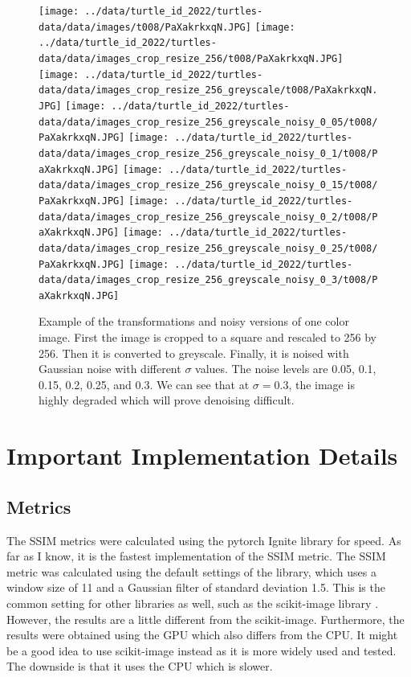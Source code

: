 \documentclass[12pt]{article}
\begin{document}
\begin{figure}
    \centering
    \texttt{[image: ../data/turtle\_id\_2022/turtles-data/data/images/t008/PaXakrkxqN.JPG]}
    \texttt{[image: ../data/turtle\_id\_2022/turtles-data/data/images\_crop\_resize\_256/t008/PaXakrkxqN.JPG]}
    \texttt{[image: ../data/turtle\_id\_2022/turtles-data/data/images\_crop\_resize\_256\_greyscale/t008/PaXakrkxqN.JPG]}
    \texttt{[image: ../data/turtle\_id\_2022/turtles-data/data/images\_crop\_resize\_256\_greyscale\_noisy\_0\_05/t008/PaXakrkxqN.JPG]}
    \texttt{[image: ../data/turtle\_id\_2022/turtles-data/data/images\_crop\_resize\_256\_greyscale\_noisy\_0\_1/t008/PaXakrkxqN.JPG]}
    \texttt{[image: ../data/turtle\_id\_2022/turtles-data/data/images\_crop\_resize\_256\_greyscale\_noisy\_0\_15/t008/PaXakrkxqN.JPG]}
    \texttt{[image: ../data/turtle\_id\_2022/turtles-data/data/images\_crop\_resize\_256\_greyscale\_noisy\_0\_2/t008/PaXakrkxqN.JPG]}
    \texttt{[image: ../data/turtle\_id\_2022/turtles-data/data/images\_crop\_resize\_256\_greyscale\_noisy\_0\_25/t008/PaXakrkxqN.JPG]}
    \texttt{[image: ../data/turtle\_id\_2022/turtles-data/data/images\_crop\_resize\_256\_greyscale\_noisy\_0\_3/t008/PaXakrkxqN.JPG]}
    \caption{Example of the transformations and noisy versions of one color image.
    First the image is cropped to a square and rescaled to 256 by 256.
    Then it is converted to greyscale.
    Finally, it is noised with Gaussian noise with different $\sigma$ values.
    The noise levels are 0.05, 0.1, 0.15, 0.2, 0.25, and 0.3.
    We can see that at $\sigma = 0.3$, the image is highly degraded which will prove denoising difficult.
    }
    \label{fig:example_turtle_images}

\end{figure}



\section{Important Implementation Details}

\subsection{Metrics}

The SSIM metrics were calculated using the pytorch Ignite library \cite{pytorch-ignite} for speed.
As far as I know, it is the fastest implementation of the SSIM metric.
The SSIM metric was calculated using the default settings of the library, which uses a window size of 11 and a Gaussian filter of standard deviation 1.5.
This is the common setting for other libraries as well, such as the scikit-image library \cite{scikit-image}.
However, the results are a little different from the scikit-image.
Furthermore, the results were obtained using the GPU which also differs from the CPU.
It might be a good idea to use scikit-image instead as it is more widely used and tested.
The downside is that it uses the CPU which is slower.
\end{document}
